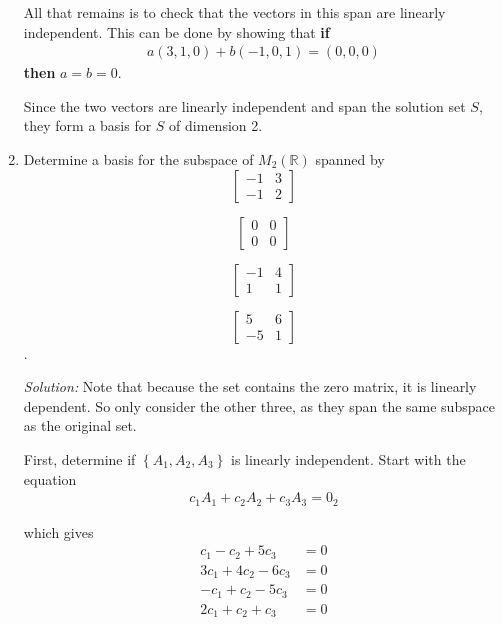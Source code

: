 \documentclass[a4paper,10pt]{report}
\begin{document}
\begin{enumerate}
    All that remains is to check that the vectors in this span are linearly independent. This can be done by showing that \textbf{if}
    \begin{align*}
      a(3,1,0) + b(-1,0,1) = (0,0,0)
    \end{align*}
    \textbf{then} $a=b=0$.

    Since the two vectors are linearly independent and span the solution set $S$, they form a basis for $S$ of dimension 2.

    \hrulefill

    \item
      Determine a basis for the subspace of $M_2(\mathbb{R})$ spanned by
      \[\begin{bmatrix}
      -1 & 3 \\
      -1 & 2
      \end{bmatrix}\]

      \[\begin{bmatrix}
      0 & 0 \\
      0 & 0
      \end{bmatrix}\]

      \[\begin{bmatrix}
      -1 & 4 \\
      1 & 1
      \end{bmatrix}\]

      \[\begin{bmatrix}
      5 & 6 \\
      -5 & 1
      \end{bmatrix}\].\

  \hrulefill

  \textit{Solution:}
    Note that because the set contains the zero matrix, it is linearly dependent. So only consider the other three, as they span the same subspace as the original set.

    First, determine if $\left\{ A_1, A_2, A_3\right\}$ is linearly independent. Start with the equation
    \begin{align*}
      c_1A_1 + c_2A_2 + c_3A_3 = 0_2
    \end{align*}

    which gives
    \begin{align*}
      c_1 - 	c_2 + 	5c_3 	&= 0 \\
      3c_1 + 	4c_2 -	6c_3 	&= 0 \\
      -c_1 +	c_2 - 	5c_3 	&= 0 \\
      2c_1 + 	c_2 + 	c_3 	&= 0
    \end{align*}


\end{enumerate}
\end{document}
